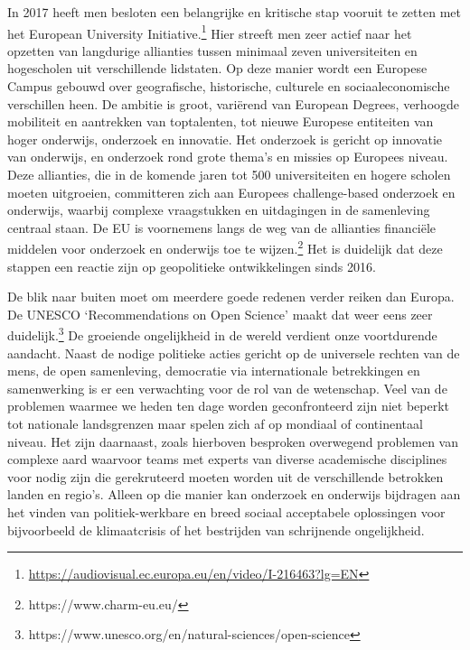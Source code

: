 \documentclass{jote-book}
\begin{document}
	In 2017 heeft men besloten een belangrijke en kritische stap vooruit te zetten met het European University Initiative.\footnote{\href{https://audiovisual.ec.europa.eu/en/video/I-216463?lg=EN}{https://audiovisual.ec.europa.eu/en/video/I-216463?lg=EN} } Hier streeft men zeer actief naar het opzetten van langdurige allianties tussen minimaal zeven universiteiten en hogescholen uit verschillende lidstaten. Op deze manier wordt een Europese Campus gebouwd over geografische, historische, culturele en sociaaleconomische verschillen heen. De ambitie is groot, variërend van European Degrees, verhoogde mobiliteit en aantrekken van toptalenten, tot nieuwe Europese entiteiten van hoger onderwijs, onderzoek en innovatie. Het onderzoek is gericht op innovatie van onderwijs, en onderzoek rond grote thema's en missies op Europees niveau. Deze allianties, die in de komende jaren tot 500 universiteiten en hogere scholen moeten uitgroeien, committeren zich aan Europees challenge-based onderzoek en onderwijs, waarbij complexe vraagstukken en uitdagingen in de samenleving centraal staan. De EU is voornemens langs de weg van de allianties financiële middelen voor onderzoek en onderwijs toe te wijzen.\footnote{https://www.charm-eu.eu/} Het is duidelijk dat deze stappen een reactie zijn op geopolitieke ontwikkelingen sinds 2016.



	De blik naar buiten moet om meerdere goede redenen verder reiken dan Europa. De UNESCO ‘Recommendations on Open Science' maakt dat weer eens zeer duidelijk.\footnote{https://www.unesco.org/en/natural-sciences/open-science} De groeiende ongelijkheid in de wereld verdient onze voortdurende aandacht. Naast de nodige politieke acties gericht op de universele rechten van de mens, de open samenleving, democratie via internationale betrekkingen en samenwerking is er een verwachting voor de rol van de wetenschap. Veel van de problemen waarmee we heden ten dage worden geconfronteerd zijn niet beperkt tot nationale landsgrenzen maar spelen zich af op mondiaal of continentaal niveau. Het zijn daarnaast, zoals hierboven besproken overwegend problemen van complexe aard waarvoor teams met experts van diverse academische disciplines voor nodig zijn die gerekruteerd moeten worden uit de verschillende betrokken landen en regio's. Alleen op die manier kan onderzoek en onderwijs bijdragen aan het vinden van politiek-werkbare en breed sociaal acceptabele oplossingen voor bijvoorbeeld de klimaatcrisis of het bestrijden van schrijnende ongelijkheid.
\end{document}
